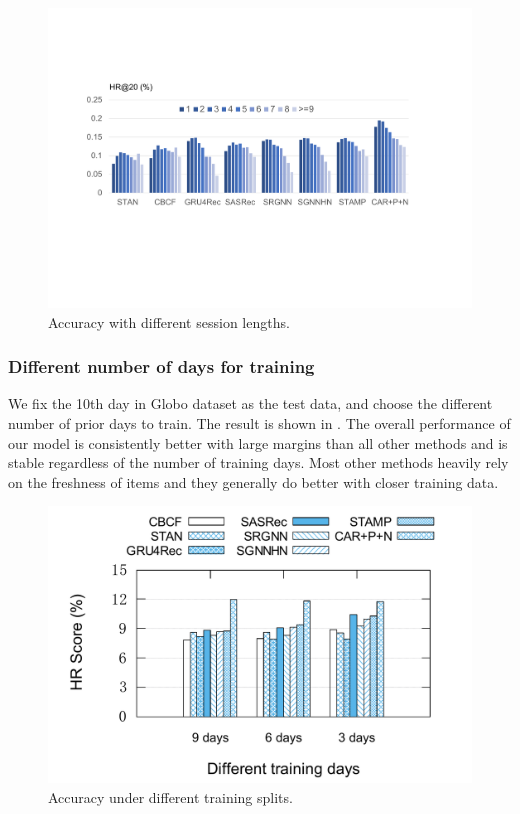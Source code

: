 \begin{figure}[th]
  \centering
  \includegraphics[width=0.85\columnwidth]{fig/input_len.pdf}
  \caption{Accuracy with different session lengths.}
  \label{fig:inputlen}
\end{figure}

\subsubsection{Different number of days for training}
\label{sec:robo}
We fix the 10th day in Globo dataset as the test data, and choose the different number of prior days to train. The result is shown in . The overall performance of our model is consistently 
better with large margins than all other methods and is stable regardless of the number of training days. 
Most other methods heavily rely on the freshness of items and they generally 
do better with closer training data. 

\begin{figure}[th]
  \centering
  \includegraphics[width=0.7\columnwidth]{fig/diff_day_len.pdf}
  \caption{Accuracy under different training splits.}
  \label{fig:trainlen}
\end{figure}


